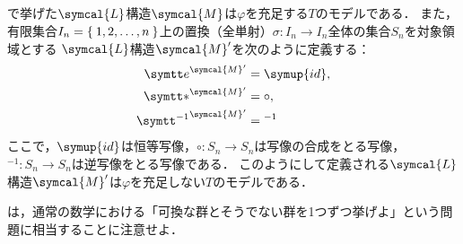 \subsection*{}

で挙げた\(\symcal{L}\)構造\(\symcal{M}\)は\(\varphi\)を充足する\(T\)のモデルである．
また，有限集合\(I_n = \Set{1, 2, \dots, n}\)上の置換（全単射）\(\sigma \colon I_n \to I_n\)全体の集合\(S_n\)を対象領域とする
\(\symcal{L}\)構造\(\symcal{M}'\)を次のように定義する：
\begin{align*}
	\interpretation{\symcal{M}'}{\obj{e}}       & = \symup{id}, \\
	\interpretation{\symcal{M}'}{\obj{\ast}}    & = \circ,      \\
	\interpretation{\symcal{M}'}{\obj{{}^{-1}}} & = {}^{-1}
\end{align*}
ここで，\(\symup{id}\)は恒等写像，\(\circ \colon S_n \to S_n\)は写像の合成をとる写像，
\({}^{-1} \colon S_n \to S_n\)は逆写像をとる写像である．
このようにして定義される\(\symcal{L}\)構造\(\symcal{M}'\)は\(\varphi\)を充足しない\(T\)のモデルである．

は，通常の数学における「可換な群とそうでない群を1つずつ挙げよ」という問題に相当することに注意せよ．

\section*{}

\subsection*{}


